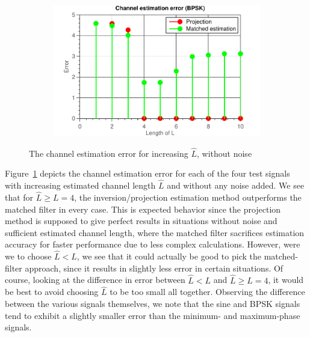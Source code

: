 \documentclass[11pt,titlepage]{report}
\begin{document}
\begin{figure}[H]
\begin{subfigure}{0.49\textwidth}
	\end{subfigure}
	\begin{subfigure}{0.49\textwidth}
		\includegraphics[width=\textwidth]{resource/ass-1-report-9-BPSK.pdf}
	\end{subfigure}
	\caption{The channel estimation error for increasing $\hat{L}$, without noise}
	\label{fig:rep9-error}
\end{figure}

Figure~\ref{fig:rep9-error} depicts the channel estimation error for each of the four test signals with increasing estimated channel length $\hat{L}$ and without any noise added. We see that for $\hat{L} \ge L = 4$, the inversion/projection estimation method outperforms the matched filter in every case. This is expected behavior since the projection method is supposed to give perfect results in situations without noise and sufficient estimated channel length, where the matched filter sacrifices estimation accuracy for faster performance due to less complex calculations.
However, were we to choose $\hat{L} < L$, we see that it could actually be good to pick the matched-filter approach, since it results in slightly less error in certain situations. Of course, looking at the difference in error between $\hat{L} < L$ and $\hat{L} \ge L = 4$, it would be best to avoid choosing $\hat{L}$ to be too small all together.
Observing the difference between the various signals themselves, we note that the sine and BPSK signals tend to exhibit a slightly smaller error than the minimum- and maximum-phase signals.
\end{document}
